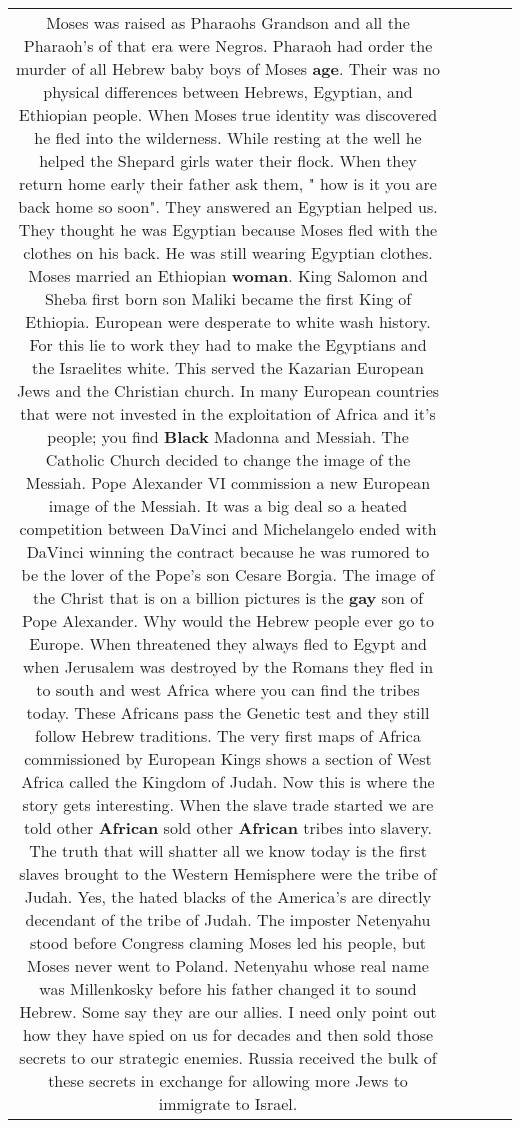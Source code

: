 \documentclass[11pt]{article}
\newlength\mylength
\begin{document}
\begin{center}
\begin{longtable}{|C{.65\mylength}|C{.30\mylength}|C{.12\mylength}|C{.12\mylength}|C{.12\mylength}|}
Moses was raised as Pharaohs Grandson and all the Pharaoh's of that era were Negros. Pharaoh had order the murder of all Hebrew baby boys of Moses \textbf{age}. Their was no physical differences between Hebrews, Egyptian, and Ethiopian people. When Moses true identity was discovered he fled into the wilderness. While resting at the well he helped the Shepard girls water their flock. When they return home early their father ask them, " how is it you are back home so soon". They answered an Egyptian helped us. They thought he was Egyptian because Moses fled with the clothes on his back. He was still wearing Egyptian clothes. Moses married an Ethiopian \textbf{woman}. King Salomon and Sheba first born son Maliki became the first King of Ethiopia. 
European were desperate to white wash history. For this lie to work they had to make the Egyptians and the Israelites white. This served the Kazarian European Jews and the Christian church. In many European countries that were not invested in the exploitation of Africa and it's people; you find \textbf{Black} Madonna and Messiah.
The Catholic Church decided to change the image of the Messiah. Pope Alexander VI commission a new European image of the Messiah. It was a big deal so a heated competition between DaVinci and Michelangelo ended with DaVinci winning the contract because he was rumored to be the lover of the Pope's son Cesare Borgia. The image of the Christ that is on a billion pictures is the \textbf{g\textbf{ay}} son of Pope Alexander. 
Why would the Hebrew people ever go to Europe. When threatened they always fled to Egypt and when Jerusalem was destroyed by the Romans they fled in to south and west Africa where you can find the tribes today. These Africans pass the Genetic test and they still follow Hebrew traditions. 
The very first maps of Africa commissioned by European Kings shows a section of West Africa called the Kingdom of Judah. Now this is where the story gets interesting. When the slave trade started we are told other \textbf{African} sold other \textbf{African} tribes into slavery. The truth that will shatter all we know today is the first slaves brought to the Western Hemisphere were the tribe of Judah. Yes, the hated blacks of the America's are directly decendant of the tribe of Judah.
The imposter Netenyahu stood before Congress claming Moses led his people, but Moses never went to Poland. Netenyahu whose real name was Millenkosky before his father changed it to sound Hebrew.
Some say they are our allies. I need only point out how they have spied on us for decades and then sold those secrets to our strategic enemies. Russia received the bulk of these secrets in exchange for allowing more Jews to immigrate to Israel.

\end{longtable}
\end{center}
\end{document}
